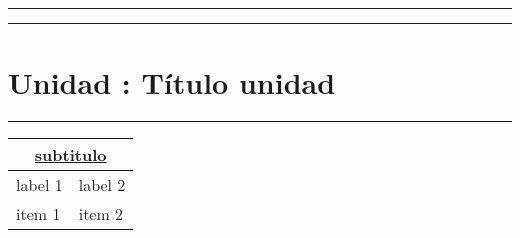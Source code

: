 \documentclass[../main.tex]{subfiles}
\begin{document}
\vspace{0.2in}
\hrule
\vspace{0.2in}
\hrule
\section{Unidad : Título unidad}
\hrule
\vspace{0.1in}
\begin{tabularx}{\textwidth}{|X|X|}
\hline
\multicolumn{2}{|c|}{\underline{\textbf{subtitulo}}} \\
\hline
  label 1 & label 2 \\
  \hline 
  item 1  & item 2  \\
  \hline
\end{tabularx}
\end{document}
